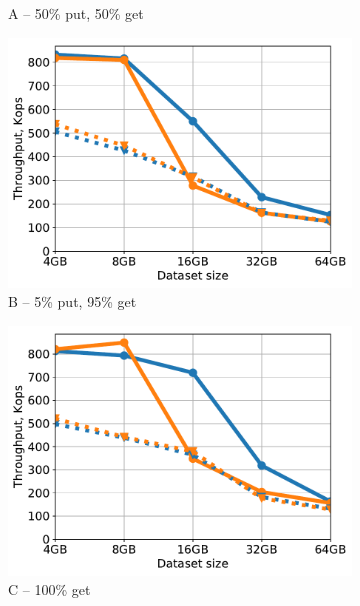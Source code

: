 \begin{figure}[tb]
\begin{subfigure}{0.3\linewidth}
\caption{A -- 50\% put, 50\% get}
\label{fig:throughput:a}
\end{subfigure}
\hspace{0.01\linewidth} 
\begin{subfigure}{0.3\linewidth}
\includegraphics[width=\textwidth]{figs/Workload_B_line.pdf}
\caption{B -- 5\% put, 95\% get}
\label{fig:throughput:b}
\end{subfigure}
\hspace{70pt}
\begin{subfigure}{0.3\linewidth}
\includegraphics[width=\textwidth]{figs/Workload_C_line.pdf}
\caption{C -- 100\% get}
\label{fig:throughput:c}
\end{subfigure}
\begin{subfigure}{0.3\linewidth}

\end{subfigure}
\end{figure}
